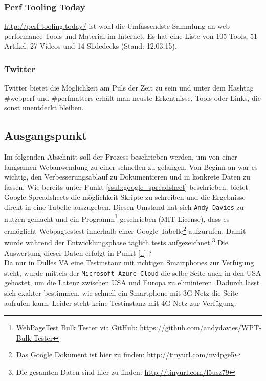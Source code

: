 
		\subsubsection{Perf Tooling Today} %
		\label{ssub:perf_tooling_today}
			\url{http://perf-tooling.today/} ist wohl die Umfassendste Sammlung an web performance Tools und Material im Internet. Es hat eine Liste von 105 Tools, 51 Artikel, 27 Videos und 14 Slidedecks (Stand: 12.03.15).
		

		\subsubsection{Twitter} %
		\label{ssub:twitter}
			Twitter bietet die Möglichkeit am Puls der Zeit zu sein und unter dem Hashtag \#webperf und \#perfmatters erhält man neuste Erkentnisse, Tools oder Links, die sonst unentdeckt bleiben.
		
	\pagebreak


	\subsection{Ausgangspunkt}
	\label{sub:ausgangspunkt}
		Im folgenden Abschnitt soll der Prozess beschrieben werden, um von einer langsamen Webanwendung zu einer schnellen zu gelangen. Von Beginn an war es wichtig, den Verbesserungsablauf zu Dokumentieren und in konkrete Daten zu fassen. Wie bereits unter Punkt \ref{ssub:google_spreadsheet} beschrieben, bietet Google Spreadsheets die möglichkeit Skripte zu schreiben und die Ergebnisse direkt in eine Tabelle auszugeben. Diesen Umstand hat sich \texttt{Andy Davies} zu nutzen gemacht und ein Programm\footnote{WebPageTest Bulk Tester via GitHub: \url{https://github.com/andydavies/WPT-Bulk-Tester}} geschrieben (MIT License), dass es ermöglicht Webpagtestest innerhalb einer Google Tabelle\footnote{Das Google Dokument ist hier zu finden: \url{http://tinyurl.com/nv4pge5}} aufzurufen. Damit wurde während der Entwicklungsphase täglich tests aufgezeichnet.\footnote{Die gesamten Daten sind hier zu finden: \url{http://tinyurl.com/l5usz79}} Die Auswertung dieser Daten erfolgt in Punkt \ref{..} ?\\

		Da nur in Dulles VA eine Testinstanz mit richtigen Smartphones zur Verfügung steht, wurde mittels der \texttt{Microsoft Azure Cloud} die selbe Seite auch in den USA gehostet, um die Latenz zwischen USA und Europa zu eliminieren. Dadurch lässt sich exakter bestimmen, wie schnell ein Smartphone mit 3G Netz die Seite aufrufen kann. Leider steht keine Testinstanz mit 4G Netz zur Verfügung.\\

